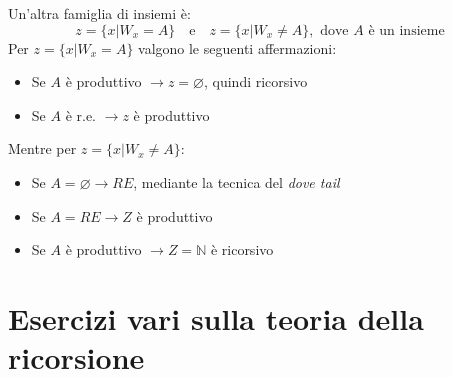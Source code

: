 \documentclass[a4paper,oneside]{scrbook}
\begin{document}
\noindent
Un'altra famiglia di insiemi è:
\begin{equation*}
    z=\{x|W_x=A\} \quad \text{e} \quad z=\{x|W_x\ne A\}, \text{ dove $A$ è un insieme}
\end{equation*}
Per $z=\{x|W_x=A\}$ valgono le seguenti affermazioni:
\begin{itemize}
    \item Se $A$ è produttivo $\rightarrow z=\varnothing$, quindi ricorsivo
    \item Se $A$ è r.e. $\rightarrow z$ è produttivo
\end{itemize}
Mentre per $z=\{x|W_x\ne A\}$:
\begin{itemize}
    \item Se $A=\varnothing \rightarrow RE$, mediante la tecnica del \textit{dove tail}
    \item Se $A=RE \rightarrow Z$ è produttivo
    \item Se $A$ è produttivo $\rightarrow Z=\mathbb{N}$ è ricorsivo
\end{itemize}

\chapter{Esercizi vari sulla teoria della ricorsione}
\end{document}
